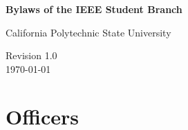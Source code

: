 \documentclass{article}
\begin{document}
\begin{titlepage}
  \begin{center}
    \vspace*{1cm}
    \textbf{\huge{Bylaws of the IEEE Student Branch}}
    
    \vspace{0.5cm}

    \Large{California Polytechnic State University}


    \vfill
    \large{Revision 1.0}\\
    \today 
  \end{center}
\end{titlepage}


\tableofcontents
\clearpage


\section{Officers}
\end{document}
